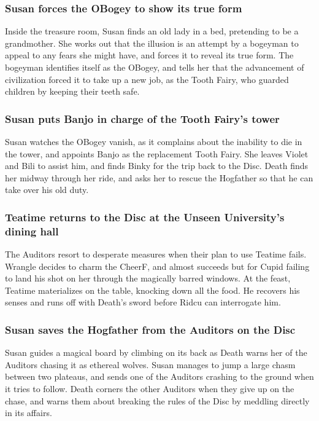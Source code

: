 \subsubsection{\Gls{Susan} forces the \Gls{OBogey} to show its true form}
Inside the treasure room, \Gls{Susan} finds an old lady in a bed, pretending to be a grandmother.
She works out that the illusion is an attempt by a bogeyman to appeal to any fears she might have,
and forces it to reveal its true form. The bogeyman identifies itself as the \Gls{OBogey}, and tells
her that the advancement of civilization forced it to take up a new job, as the Tooth Fairy, who
guarded children by keeping their teeth safe.

\subsubsection{\Gls{Susan} puts \Gls{Banjo} in charge of the Tooth Fairy's tower}
\Gls{Susan} watches the \Gls{OBogey} vanish, as it complains about the inability to die in the
tower, and appoints \Gls{Banjo} as the replacement Tooth Fairy. She leaves \Gls{Violet} and
\Gls{Bili} to assist him, and finds \Gls{Binky} for the trip back to the Disc. \Gls{Death} finds her
midway through her ride, and asks her to rescue the Hogfather so that he can take over his old duty.

\subsubsection{\Gls{Teatime} returns to the Disc at the Unseen University's dining hall}
The Auditors resort to desperate measures when their plan to use \Gls{Teatime} fails. \Gls{Wrangle}
decides to charm the \Gls{CheerF}, and almost succeeds but for Cupid failing to land his shot on
her through the magically barred windows. At the feast, \Gls{Teatime} materializes on the table,
knocking down all the food. He recovers his senses and runs off with \Gls{Death}'s sword before
\Gls{Ridcu} can interrogate him.

\subsubsection{\Gls{Susan} saves the Hogfather from the Auditors on the Disc}
\Gls{Susan} guides a magical board by climbing on its back as \Gls{Death} warns her of the Auditors
chasing it as ethereal wolves. \Gls{Susan} manages to jump a large chasm between two plateaus,
and sends one of the Auditors crashing to the ground when it tries to follow. \Gls{Death} corners
the other Auditors when they give up on the chase, and warns them about breaking the rules of the
Disc by meddling directly in its affairs.

